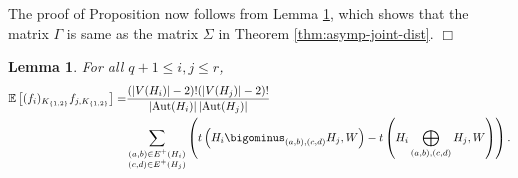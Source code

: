 \documentclass[11pt,reqno]{amsart}
\numberwithin{equation}{section}
\newtheorem{lemma}{Lemma}[section]
\theoremstyle{definition}
\begin{document}
The proof of Proposition now follows from Lemma \ref{lemma:covariance-structure}, which shows that the matrix $\Gamma$ is same as the matrix $\Sigma$ in Theorem \ref{thm:asymp-joint-dist}. \hfill $\Box$ 

\begin{lemma}\label{lemma:covariance-structure}
For all $q+1 \leq i,j\leq r$,
\begin{align*}
    \mathbb{E}\left[(f_{i})_{K_{\{1,2\}}}f_{j,K_{\{1,2\}}}\right] 
    =& \dfrac{(|V(H_{i})|-2)!(|V(H_{j})|-2)!}{\left|\mathrm{Aut}(H_{i})\right|\left|\mathrm{Aut}(H_{j})\right|}\\
    &\sum_{\substack{(a,b)\in E^{+}(H_{i})\\(c,d)\in E^{+}(H_{j})}}\left(t\left(H_{i}\bigominus_{(a,b),(c,d)}H_{j},W\right) - t\left(H_{i}\bigoplus_{(a,b),(c,d)}H_{j},W\right)\right) . 
\end{align*}
\end{lemma}
\end{document}
